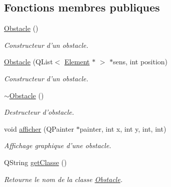 \subsection*{Fonctions membres publiques}
\begin{DoxyCompactItemize}
\item 
\hypertarget{classObstacle_a8f734072321fa06a7b7dae2d5f50f352}{
\hyperlink{classObstacle_a8f734072321fa06a7b7dae2d5f50f352}{Obstacle} ()}
\label{classObstacle_a8f734072321fa06a7b7dae2d5f50f352}

\begin{DoxyCompactList}\small\item\em Constructeur d'un obstacle. \item\end{DoxyCompactList}\item 
\hyperlink{classObstacle_aaf39f191e411a16f1bd9573da092da04}{Obstacle} (QList$<$ \hyperlink{classElement}{Element} $\ast$ $>$ $\ast$sens, int position)
\begin{DoxyCompactList}\small\item\em Constructeur d'un obstacle. \item\end{DoxyCompactList}\item 
\hypertarget{classObstacle_af2f9cc9c6cff75dca0974fd5ac4f71a9}{
\hyperlink{classObstacle_af2f9cc9c6cff75dca0974fd5ac4f71a9}{$\sim$Obstacle} ()}
\label{classObstacle_af2f9cc9c6cff75dca0974fd5ac4f71a9}

\begin{DoxyCompactList}\small\item\em Destructeur d'obstacle. \item\end{DoxyCompactList}\item 
void \hyperlink{classObstacle_a77cfc135a2b1fdfe4fab6c7c3713a749}{afficher} (QPainter $\ast$painter, int x, int y, int, int)
\begin{DoxyCompactList}\small\item\em Affichage graphique d'une obstacle. \item\end{DoxyCompactList}\item 
QString \hyperlink{classObstacle_a7773466eaafb92cef0ec22f5cc79522c}{getClasse} ()
\begin{DoxyCompactList}\small\item\em Retourne le nom de la classe \hyperlink{classObstacle}{Obstacle}. \item\end{DoxyCompactList}\end{DoxyCompactItemize}


